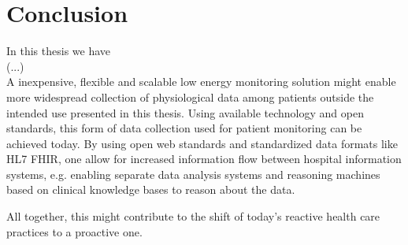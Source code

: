 \section{Conclusion} %
\label{sec:conclusion}

In this thesis we have 
\\
\newline
(...)
\\
\newline
A inexpensive, flexible and scalable low energy monitoring solution might enable more widespread collection of physiological data among patients outside the intended use presented in this thesis. Using available technology and open standards, this form of data collection used for patient monitoring can be achieved today. By using open web standards and standardized data formats like HL7 FHIR, one allow for increased information flow between hospital information systems, e.g. enabling separate data analysis systems and reasoning machines based on clinical knowledge bases to reason about the data. 

All together, this might contribute to the shift of today's reactive health care practices to a proactive one.

